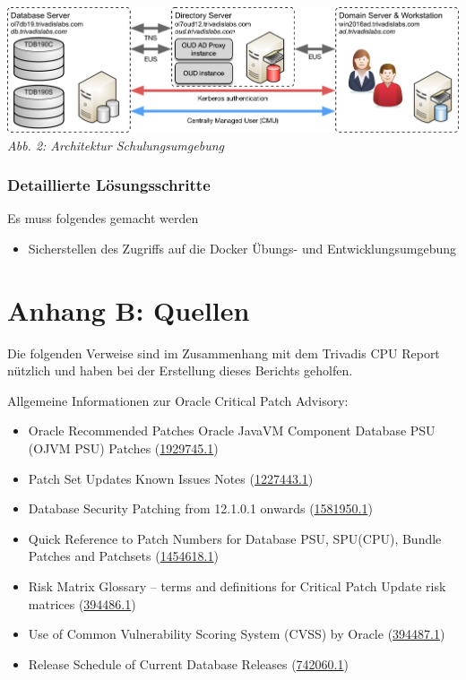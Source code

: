 \includegraphics{examples/images/LabEnvironment.png} \emph{Abb. 2:
Architektur Schulungsumgebung}

\hypertarget{detaillierte-luxf6sungsschritte-1}{%
\subsubsection{Detaillierte
Lösungsschritte}\label{detaillierte-luxf6sungsschritte-1}}

Es muss folgendes gemacht werden

\begin{itemize}
\tightlist
\item
  Sicherstellen des Zugriffs auf die Docker Übungs- und
  Entwicklungsumgebung
\end{itemize}

\hypertarget{anhang-b-quellen}{%
\section{Anhang B: Quellen}\label{anhang-b-quellen}}

Die folgenden Verweise sind im Zusammenhang mit dem Trivadis CPU Report
nützlich und haben bei der Erstellung dieses Berichts geholfen.

Allgemeine Informationen zur Oracle Critical Patch Advisory:

\begin{itemize}
\tightlist
\item
  Oracle Recommended Patches Oracle JavaVM Component Database PSU (OJVM
  PSU) Patches
  (\href{https://support.oracle.com/epmos/faces/DocumentDisplay?id=1929745.1}{1929745.1})
\item
  Patch Set Updates Known Issues Notes
  (\href{https://support.oracle.com/epmos/faces/DocumentDisplay?id=1227443.1}{1227443.1})
\item
  Database Security Patching from 12.1.0.1 onwards
  (\href{https://support.oracle.com/epmos/faces/DocumentDisplay?id=1581950.1}{1581950.1})
\item
  Quick Reference to Patch Numbers for Database PSU, SPU(CPU), Bundle
  Patches and Patchsets
  (\href{https://support.oracle.com/epmos/faces/DocumentDisplay?id=1454618.1}{1454618.1})
\item
  Risk Matrix Glossary -- terms and definitions for Critical Patch
  Update risk matrices
  (\href{https://support.oracle.com/epmos/faces/DocumentDisplay?id=394486.1}{394486.1})
\item
  Use of Common Vulnerability Scoring System (CVSS) by Oracle
  (\href{https://support.oracle.com/epmos/faces/DocumentDisplay?id=394487.1}{394487.1})
\item
  Release Schedule of Current Database Releases
  (\href{https://support.oracle.com/epmos/faces/DocumentDisplay?id=742060.1}{742060.1})
\end{itemize}

